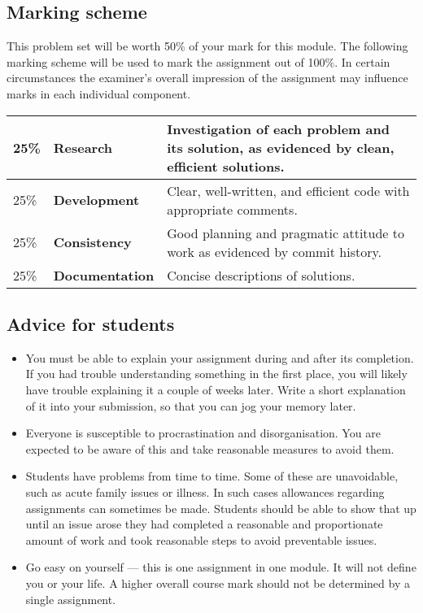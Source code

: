 \documentclass[a4paper, 12pt]{exam}
\begin{document}
\subsection*{Marking scheme}
  This problem set will be worth 50\% of your mark for this module.
  The following marking scheme will be used to mark the assignment out of 100\%.
  In certain circumstances the examiner's overall impression of the assignment may influence marks in each individual component.

  \begin{center}
    \begin{tabular}{llp{8.4cm}}
      \toprule
      25\% & \textbf{Research} & Investigation of each problem and its solution, as evidenced by clean, efficient solutions. \\
      \midrule
      25\% & \textbf{Development} & Clear, well-written, and efficient code with appropriate comments. \\
      \midrule
      25\% & \textbf{Consistency} & Good planning and pragmatic attitude to work as evidenced by commit history. \\
      \midrule
      25\% & \textbf{Documentation} & Concise descriptions of solutions. \\
      \bottomrule
    \end{tabular}
  \end{center}

  \subsection*{Advice for students}
  \begin{itemize}
    \item
      You must be able to explain your assignment during and after its completion.
      If you had trouble understanding something in the first place, you will likely have trouble explaining it a couple of weeks later.
      Write a short explanation of it into your submission, so that you can jog your memory later.
    \item
      Everyone is susceptible to procrastination and disorganisation.
      You are expected to be aware of this and take reasonable measures to avoid them.
    \item
      Students have problems from time to time.
      Some of these are unavoidable, such as acute family issues or illness.
      In such cases allowances regarding assignments can sometimes be made.
      Students should be able to show that up until an issue arose they had completed a reasonable and proportionate amount of work and took reasonable steps to avoid preventable issues.
    \item
      Go easy on yourself --- this is one assignment in one module.
      It will not define you or your life.
      A higher overall course mark should not be determined by a single assignment.
  \end{itemize}
\end{document}
